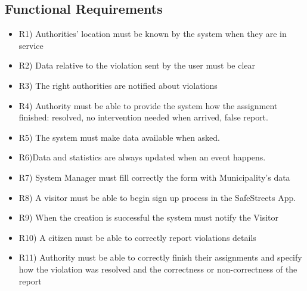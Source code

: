 \subsection{Functional Requirements}
\begin{itemize}

 \item R1) Authorities’ location must be known by the system when they are in service
\item  R2) Data relative to the violation sent by the user must be clear
 \item R3) The right authorities are notified about violations
 \item R4) Authority must be able to provide the system how the assignment finished: resolved, no intervention needed when arrived, false report.
 \item R5) The system must make data available when asked.
 \item R6)Data and statistics are always updated when an event happens.  
\item R7) System Manager must fill correctly the form with Municipality’s data
 \item R8) A visitor must be able to begin sign up process in the SafeStreets App.
 \item R9) When the creation is successful the system must notify the Visitor 
 \item R10) A citizen must be able to correctly report violations details
 \item R11) Authority must be able to correctly finish their assignments and specify how the violation was resolved and the correctness or non-correctness of the report
\end{itemize}
